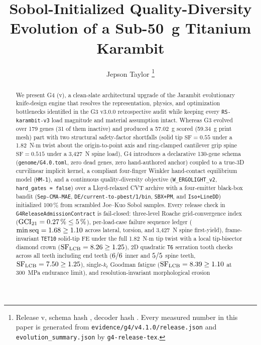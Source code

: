 \documentclass[10pt,journal,letterpaper]{IEEEtran}
\DeclareRobustCommand{\code}[1]{\texorpdfstring{{\nolinkurl{#1}}}{#1}}
\begin{document}
\title{Sobol-Initialized Quality-Diversity Evolution of a Sub-50~g Titanium Karambit}
\author{Jepson Taylor%
\thanks{Release v\GFourVersion, schema hash \GFourSchemaSha, decoder hash \GFourDecoderSha. Every measured number in this
paper is generated from \code{evidence/g4/v4.1.0/release.json} and \code{evolution_summary.json} by \code{g4-release-tex}.}}
\maketitle

\begin{abstract}
We present G4 (v\GFourVersion), a clean-slate architectural upgrade of the Jarambit evolutionary knife-design engine that resolves
the representation, physics, and optimization bottlenecks identified in the G3 v3.0.0 retrospective audit while keeping every
\code{RS-karambit-v3} load magnitude and material assumption intact. Whereas G3 evolved over 179 genes (31 of them inactive) and
produced a 57.02~g scored (59.34~g print mesh) part with two structural safety-factor shortfalls (solid tip $\mathrm{SF}=0.55$
under a 1.82~N$\cdot$m twist about the origin-to-point axis and ring-clamped cantilever grip spine $\mathrm{SF}=0.515$ under a
3,427~N spine load), G4 introduces a declarative 130-gene schema (\code{genome/G4.0.toml}, zero dead genes, zero hand-authored anchor)
coupled to a true-3D curvilinear implicit kernel, a compliant four-finger Winkler hand-contact equilibrium model (\code{HM-1}), and a
continuous quality-diversity objective (\code{W\_ERGOLIGHT\_v2}, \code{hard\_gates = false}) over a Lloyd-relaxed CVT archive with a
four-emitter black-box bandit (\code{Sep-CMA-MAE}, \code{DE/current-to-pbest/1/bin}, \code{SBX+PM}, and \code{Iso+LineDD}) initialized
100\,\% from scrambled Joe--Kuo Sobol samples. Every release check in \code{G4ReleaseAdmissionContract} is fail-closed: three-level
Roache grid-convergence index ($\mathrm{GCI}_{21} = 0.27\,\% \le 5\,\%$), per-load-case failure sequence ledger
($\min \mathrm{seq} = 1.68 \ge 1.10$ across lateral, torsion, and 3,427~N spine first-yield), frame-invariant \code{TET10}
solid-tip FE under the full 1.82~N$\cdot$m tip twist with a local tip-bisector diamond crown ($\mathrm{SF}_{\mathrm{LCB}} = 8.26 \ge 1.25$),
2D quadratic \code{T6} serration tooth checks across all teeth including end teeth ($6/6$ inner and
$5/5$ spine teeth, $\mathrm{SF}_{\mathrm{LCB}} = 7.50 \ge 1.25$), single-$k_t$ Goodman fatigue
($\mathrm{SF}_{\mathrm{LCB}} = 8.39 \ge 1.10$ at 300~MPa endurance limit), and resolution-invariant morphological erosion

\end{abstract}
\end{document}
